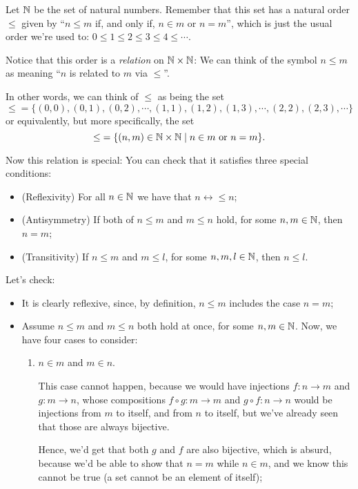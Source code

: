 \begin{ex}
	Let $\mathbb N$ be the set of natural numbers. Remember that this set has a natural order $\leq$ given by ``$n\leq m$ if, and only if, $n\in m$ or $n=m$'', which is just the usual order we're used to: $0\leq 1\leq 2\leq 3\leq 4\leq\cdots$.
	
	Notice that this order is a \textit{relation} on $\mathbb N\times\mathbb N$: We can think of the symbol $n\leq m$ as meaning ``$n$ is related to $m$ via $\leq$''.
	
	In other words, we can think of $\leq$ as being the set
	\[\operatorname{\leq}=\{(0,0),(0,1),(0,2),\cdots,(1,1),(1,2),(1,3),\cdots,(2,2),(2,3),\cdots\}\]or equivalently, but more specifically, the set
	\[\operatorname{\leq} =\{(n,m)\in \mathbb N\times \mathbb N\mid n\in m\mbox{ or }n=m\}.\]
	
	Now this relation is special: You can check that it satisfies three special conditions:
	
	\begin{itemize}
		\item (Reflexivity) For all $n\in \mathbb N$ we have that $n\rel{\leq}n$;
		\item (Antisymmetry) If both of $n\leq m$ and $m\leq n$ hold, for some $n,m\in \mathbb N$, then $n=m$;
		\item (Transitivity) If $n\leq m$ and $m\leq l$, for some $n,m,l\in \mathbb N$, then $n\leq l$.
	\end{itemize}

Let's check:

\begin{itemize}
	\item It is clearly reflexive, since, by definition, $n\leq m$ includes the case $n=m$;
	
	\item Assume $n\leq m$ and $m\leq n$ both hold at once, for some $n,m\in \mathbb N$. Now, we have four cases to consider:
	\begin{enumerate}
		\item $n\in m$ and $m\in n$.
		
		This case cannot happen, because we would have injections $f:n\to m$ and $g:m\to n$, whose compositions $f\circ g:m\to m$ and $g\circ f:n\to n$ would be injections from $m$ to itself, and from $n$ to itself, but we've already seen that those are always bijective. 
		
		Hence, we'd get that both $g$ and $f$ are also bijective, which is absurd, because we'd be able to show that $n=m$ while $n\in m$, and we know this cannot be true (a set cannot be an element of itself);
		

\end{enumerate}
\end{itemize}
\end{ex}
